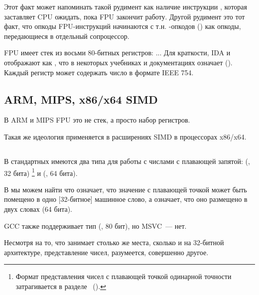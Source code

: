 Этот факт может напоминать такой рудимент как наличие инструкции , которая заставляет
\ac{CPU} ожидать, пока \ac{FPU} закончит работу.
Другой рудимент это тот факт, что опкоды \ac{FPU}-инструкций начинаются с т.н. -опкодов 
() как опкоды, передающиеся в отдельный сопроцессор.

\label{FPU_is_stack}
FPU имеет стек из восьми 80-битных регистров: ...
Для краткости, IDA и \olly отображают  как ,
что в некоторых учебниках и документациях означает  ().
Каждый регистр может содержать число в формате IEEE 754\FNURLIEEE.

\subsection{ARM, MIPS, x86/x64 SIMD}

В ARM и MIPS FPU это не стек, а просто набор регистров.

Такая же идеология применяется в расширениях SIMD в процессорах x86/x64.

\subsection{\CCpp}

В стандартных \CCpp имеются два типа для работы с числами с плавающей запятой: 
\Tfloat (\FNURLSP, 32 бита)
\footnote{Формат представления чисел с плавающей точкой одинарной точности затрагивается в разделе 
\IT{\WorkingWithFloatAsWithStructSubSubSectionName}~().}
и \Tdouble (\FNURLDP, 64 бита).

В  мы можем найти что  означает, что значение с плавающей точкой может быть
помещено в одно [32-битное] машинное слово, а  означает, что оно размещено в двух словах (64 бита).

GCC также поддерживает тип  (\FNURLEP, 80 бит), но MSVC~--- нет.

Несмотря на то, что \Tfloat занимает столько же места, сколько и \Tint на 32-битной архитектуре, 
представление чисел, разумеется, совершенно другое.





